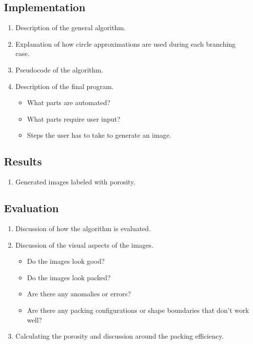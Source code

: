 \documentclass[11pt, oneside]{article}   	%
\begin{document}
\subsection*{Implementation}
\begin{enumerate}
	\item Description of the general algorithm.
	\item Explanation of how circle approximations are used during each branching case.
	\item Pseudocode of the algorithm.
	\item Description of the final program.
	\begin{itemize}
		\item What parts are automated?
		\item What parts require user input?
		\item Steps the user has to take to generate an image.
	\end{itemize}
\end{enumerate}

\subsection*{Results}
\begin{enumerate}
	\item Generated images labeled with porosity.
\end{enumerate}

\subsection*{Evaluation}
\begin{enumerate}
	\item Discussion of how the algorithm is evaluated.
	\item Discussion of the visual aspects of the images.
	\begin{itemize}
		\item Do the images look good?
		\item Do the images look packed?
		\item Are there any anomalies or errors?
		\item Are there any packing configurations or shape boundaries that don't work well?
	\end{itemize}
	\item Calculating the porosity and discussion around the packing efficiency.
\end{enumerate}
\end{document}
